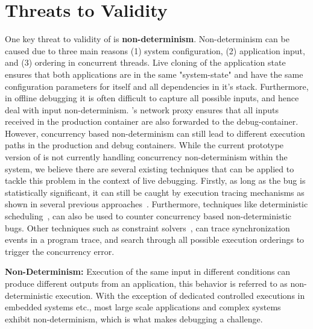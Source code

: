 \section{Threats to Validity}
\label{sec:limitation}

\noindent
One key threat to validity of \parikshan is  \textbf{non-determinism}. 
Non-determinism can be caused due to three main reasons (1) system configuration, (2) application input, and (3) ordering in concurrent threads.
Live cloning of the application state ensures that both applications are in the same "system-state" and have the same configuration parameters for itself and all dependencies in it's stack.
Furthermore, in offline debugging it is often difficult to capture all possible inputs, and hence deal with input non-determinism.
\parikshan's network proxy ensures that all inputs received in the production container are also forwarded to the debug-container.
However, concurrency based non-determinism can still lead to different execution paths in the production and debug containers.
While the current prototype version of \parikshan is not currently handling concurrency non-determinism within the system, we believe there are several existing techniques that can be applied to tackle this problem in the context of live debugging. 
Firstly, as long as the bug is statistically significant, it can still be caught by execution tracing mechanisms as shown in several previous approaches~\cite{Liblit:2004:CBI}.
Furthermore, techniques like deterministic scheduling~\cite{smt:cacm}, can also be used to counter concurrency based non-deterministic bugs.
Other techniques such as constraint solvers~\cite{dpor, best}, can trace synchronization events in a program trace, and search through all possible execution orderings to trigger the concurrency error.


\iffalse

\textbf{Non-Determinism: } 
Execution of the same input in different conditions can produce different outputs from an application, this behavior is referred to as non-deterministic execution.
With the exception of dedicated controlled executions in embedded systems etc., most large scale applications and complex systems exhibit non-determinism, which is what makes debugging a challenge.

